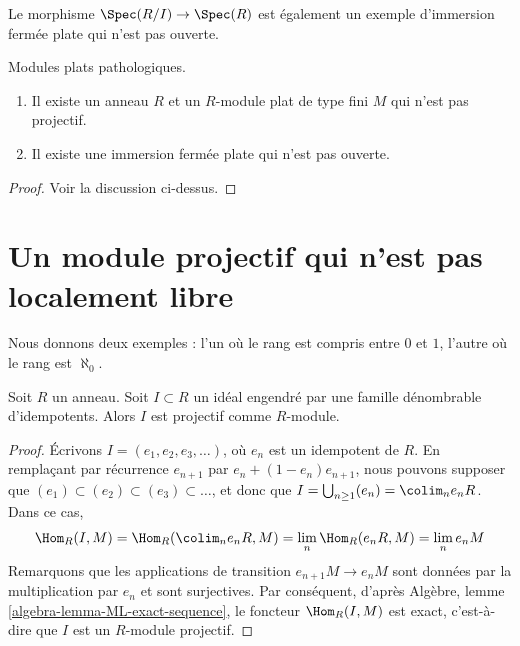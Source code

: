 \medskip\noindent
Le morphisme $\Spec(R/I) \to \Spec(R)$ est également
un exemple d'immersion fermée plate qui n'est pas ouverte.

\begin{lemma}
\label{lemma-finite-flat-non-projective}
Modules plats pathologiques.
\begin{enumerate}
\item Il existe un anneau $R$ et un $R$-module plat de type fini $M$ qui n'est pas
projectif.
\item Il existe une immersion fermée plate qui n'est pas ouverte.
\end{enumerate}
\end{lemma}

\begin{proof}
Voir la discussion ci-dessus.
\end{proof}



\section{Un module projectif qui n'est pas localement libre}
\label{section-projective-not-locally-free}

\noindent
Nous donnons deux exemples : l'un où le rang est compris entre $0$ et $1$,
l'autre où le rang est $\aleph_0$.

\begin{lemma}
\label{lemma-ideal-generated-by-idempotents-projective}
Soit $R$ un anneau. Soit $I \subset R$ un idéal engendré par
une famille dénombrable d'idempotents. Alors $I$ est projectif
comme $R$-module.
\end{lemma}

\begin{proof}
Écrivons $I = (e_1, e_2, e_3, \ldots)$, où $e_n$ est un idempotent de $R$.
En remplaçant par récurrence $e_{n + 1}$ par $e_n + (1 - e_n)e_{n + 1}$,
nous pouvons supposer que $(e_1) \subset (e_2) \subset (e_3) \subset \ldots$,
et donc que $I = \bigcup_{n \geq 1} (e_n) = \colim_n e_nR$.
Dans ce cas,
$$
\Hom_R(I, M) = \Hom_R(\colim_n e_nR, M)
= \lim_n \Hom_R(e_nR, M) = \lim_n e_nM
$$
Remarquons que les applications de transition $e_{n + 1}M \to e_nM$ sont données
par la multiplication par $e_n$ et sont surjectives. Par conséquent, d'après
Algèbre, lemme \ref{algebra-lemma-ML-exact-sequence},
le foncteur $\Hom_R(I, M)$ est exact, c'est-à-dire que $I$ est un
$R$-module projectif.
\end{proof}

